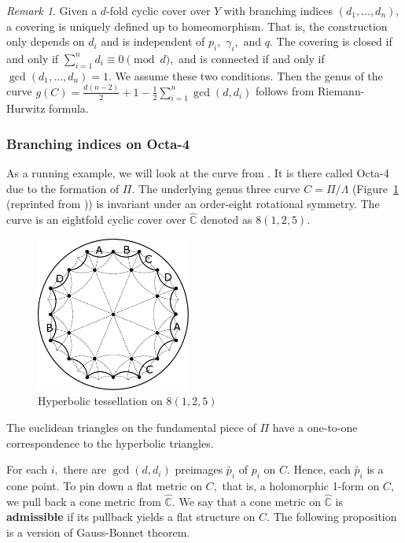 \documentclass[12pt,reqno]{amsart}
\newcommand{\C}{\mathbb{C}}
\theoremstyle{definition}
\theoremstyle{remark}
\newtheorem*{remark}{Remark}
\begin{document}
\begin{remark} Given a $d$-fold cyclic cover over $Y$ with branching indices $(d_1, \ldots , d_n),$ a covering is uniquely defined up to homeomorphism. That is, the construction only depends on $d_i$ and is independent of $p_i,$ $\gamma_i,$ and $q.$ The covering is closed if and only if $\sum\limits_{i=1}^n d_i \equiv 0 \pmod d,$ and is connected if and only if $\gcd (d_1, \ldots, d_n) = 1.$ We assume these two conditions. Then the genus of the curve $g(C) = \frac{d (n-2)}{2} + 1 - \frac{1}{2} \sum\limits_{i=1}^n \gcd(d,d_i)$ follows from Riemann-Hurwitz formula. 
\end{remark}

\subsubsection*{Branching indices on Octa-4}
As a running example, we will look at the curve from \cite{dami}. It is there called Octa-4 due to the formation of $\Pi.$ The underlying genus three curve $C = \Pi / \Lambda$ (Figure~\ref{fig:125} (reprinted from \cite{dami})) is invariant under an order-eight rotational symmetry. The curve is an eightfold cyclic cover over $\widehat{\C}$ denoted as $8 (1, 2, 5).$

\begin{figure}[htbp] %
   \centering
   \includegraphics[width=2in]{figures/125_base_.pdf} 
	\caption{Hyperbolic tessellation on $8(1, 2, 5)$}
	\label{fig:125}
\end{figure}

The euclidean triangles on the fundamental piece of $\Pi$ have a one-to-one correspondence to the hyperbolic triangles.

For each $i,$ there are $\gcd(d, d_i)$ preimages $\widetilde{p_i}$ of $p_i$ on $C.$ Hence, each $\widetilde{p_i}$ is a cone point. To pin down a flat metric on $C,$ that is, a holomorphic 1-form on $C,$ we pull back a cone metric from $\widehat{\C}.$ We say that a cone metric on $\widehat{\C}$ is \textbf{admissible} if its pullback yields a flat structure on $C.$ The following proposition is a version of Gauss-Bonnet theorem.
\end{document}
